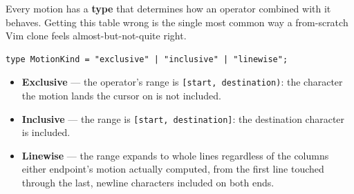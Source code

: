 \documentclass[11pt]{article}
\providecommand{\tightlist}{%
  \setlength{\itemsep}{0pt}\setlength{\parskip}{0pt}}
\begin{document}
Every motion has a \textbf{type} that determines how an operator combined with it
behaves. Getting this table wrong is the single most common way a
from-scratch Vim clone feels almost-but-not-quite right.

\begin{Verbatim}[breaklines=true, breakanywhere=true, fontsize=\small]
type MotionKind = "exclusive" | "inclusive" | "linewise";
\end{Verbatim}

\begin{itemize}
\tightlist
\item
  \textbf{Exclusive} --- the operator's range is \texttt{{[}start,\ destination)}: the
  character the motion lands the cursor on is not included.
\item
  \textbf{Inclusive} --- the range is \texttt{{[}start,\ destination{]}}: the destination
  character is included.
\item
  \textbf{Linewise} --- the range expands to whole lines regardless of the columns
  either endpoint's motion actually computed, from the first line touched
  through the last, newline characters included on both ends.
\end{itemize}
\end{document}
